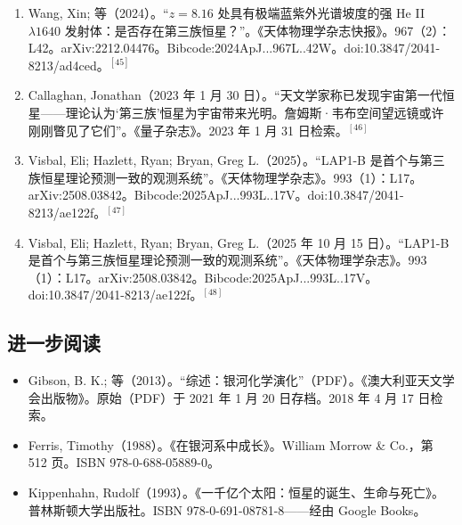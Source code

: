 \begin{enumerate}
\item Wang, Xin; 等（2024）。“$z=8.16$ 处具有极端蓝紫外光谱坡度的强 He II $\lambda1640$ 发射体：是否存在第三族恒星？”。《天体物理学杂志快报》。967（2）：L42。arXiv:2212.04476。Bibcode:2024ApJ...967L..42W。doi:10.3847/2041-8213/ad4ced。$^{[45]}$
\item Callaghan, Jonathan（2023 年 1 月 30 日）。“天文学家称已发现宇宙第一代恒星——理论认为‘第三族’恒星为宇宙带来光明。詹姆斯·韦布空间望远镜或许刚刚瞥见了它们”。《量子杂志》。2023 年 1 月 31 日检索。$^{[46]}$
\item Visbal, Eli; Hazlett, Ryan; Bryan, Greg L.（2025）。“LAP1-B 是首个与第三族恒星理论预测一致的观测系统”。《天体物理学杂志》。993（1）：L17。arXiv:2508.03842。Bibcode:2025ApJ...993L..17V。doi:10.3847/2041-8213/ae122f。$^{[47]}$
\item Visbal, Eli; Hazlett, Ryan; Bryan, Greg L.（2025 年 10 月 15 日）。“LAP1-B 是首个与第三族恒星理论预测一致的观测系统”。《天体物理学杂志》。993（1）：L17。arXiv:2508.03842。Bibcode:2025ApJ...993L..17V。doi:10.3847/2041-8213/ae122f。$^{[48]}$
\end{enumerate}
\subsection{进一步阅读}
\begin{itemize}
\item Gibson, B. K.; 等（2013）。“综述：银河化学演化”（PDF）。《澳大利亚天文学会出版物》。原始（PDF）于 2021 年 1 月 20 日存档。2018 年 4 月 17 日检索。
\item Ferris, Timothy（1988）。《在银河系中成长》。William Morrow & Co.，第 512 页。ISBN 978-0-688-05889-0。
\item Kippenhahn, Rudolf（1993）。《一千亿个太阳：恒星的诞生、生命与死亡》。普林斯顿大学出版社。ISBN 978-0-691-08781-8——经由 Google Books。
\end{itemize}